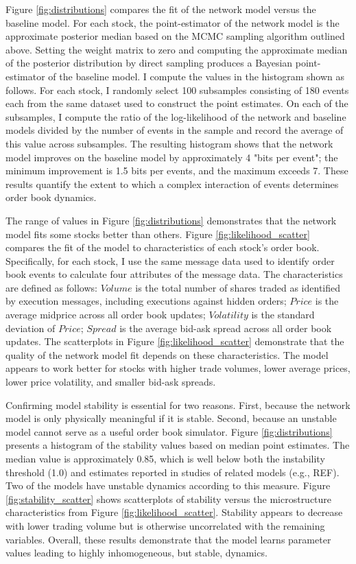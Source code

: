 		Figure \ref{fig:distributions} compares the fit of the network model versus the baseline model. For each stock, the point-estimator of the network model is the approximate posterior median based on the MCMC sampling algorithm outlined above. Setting the weight matrix to zero and computing the approximate median of the posterior distribution by direct sampling produces a Bayesian point-estimator of the baseline model. I compute the values in the histogram shown as follows. For each stock, I randomly select 100 subsamples consisting of 180 events each from the same dataset used to construct the point estimates. On each of the subsamples, I compute the ratio of the log-likelihood of the network and baseline models divided by the number of events in the sample and record the average of this value across subsamples. The resulting histogram shows that the network model improves on the baseline model by approximately 4 "bits per event"; the minimum improvement is 1.5 bits per events, and the maximum exceeds 7. These results quantify the extent to which a complex interaction of events determines order book dynamics.

		The range of values in Figure \ref{fig:distributions} demonstrates that the network model fits some stocks better than others. Figure \ref{fig:likelihood_scatter} compares the fit of the model to characteristics of each stock’s order book. Specifically, for each stock, I use the same message data used to identify order book events to calculate four attributes of the message data. The characteristics are defined as follows: $Volume$ is the total number of shares traded as identified by execution messages, including executions against hidden orders; $Price$ is the average midprice across all order book updates; $Volatility$ is the standard deviation of $Price$; $Spread$ is the average bid-ask spread across all order book updates. The scatterplots in Figure \ref{fig:likelihood_scatter} demonstrate that the quality of the network model fit depends on these characteristics. The model appears to work better for stocks with higher trade volumes, lower average prices, lower price volatility, and smaller bid-ask spreads.

		Confirming model stability is essential for two reasons. First, because the network model is only physically meaningful if it is stable. Second, because an unstable model cannot serve as a useful order book simulator. Figure \ref{fig:distributions} presents a histogram of the stability values based on median point estimates. The median value is approximately 0.85, which is well below both the instability threshold (1.0) and estimates reported in studies of related models (e.g., REF). Two of the models have unstable dynamics according to this measure. Figure \ref{fig:stability_scatter} shows scatterplots of stability versus the microstructure characteristics from Figure \ref{fig:likelihood_scatter}. Stability appears to decrease with lower trading volume but is otherwise uncorrelated with the remaining variables. Overall, these results demonstrate that the model learns parameter values leading to highly inhomogeneous, but stable, dynamics.


